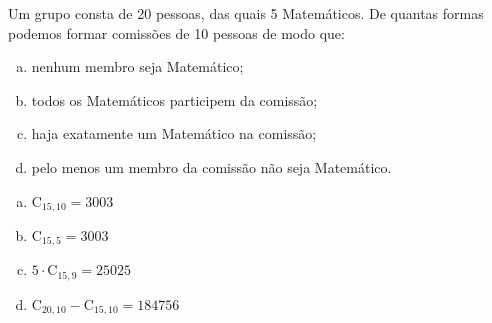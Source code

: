 \begin{ex}
 Um grupo consta de 20 pessoas, das quais 5 Matemáticos. De quantas formas podemos formar comissões de 10 pessoas de modo que:
    \begin{enumerate}[(a)]
    \item nenhum membro seja Matemático;
    \item todos os Matemáticos participem da comissão;
    \item haja exatamente um Matemático na comissão;
    \item pelo menos um membro da comissão não seja Matemático.
    \end{enumerate}
    \begin{sol} 
        \phantom{A} 
     \begin{enumerate}[(a)]
      \item $\mathrm{C}_{{15},{10}}=3003$
      \item $\mathrm{C}_{{15},5}=3003$
      \item $5\cdot\mathrm{C}_{{15,9}}=25025$
      \item $\mathrm{C}_{{20},{10}}-\mathrm{C}_{{15},{10}}=184756$
     \end{enumerate}
    \end{sol}
\end{ex}